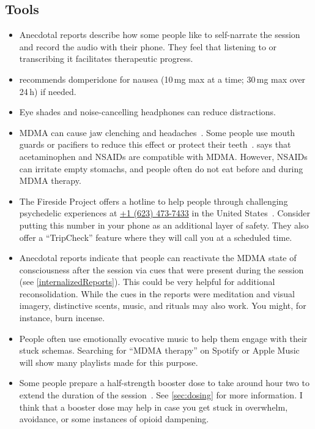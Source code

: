 \documentclass[11pt,oneside]{book}
\let\cite\parencite
\begin{document}
\subsection*{Tools}
\begin{itemize}
    \item Anecdotal reports describe how some people like to self-narrate the session and record the audio with their phone. They feel that listening to or transcribing it facilitates therapeutic progress.
    \item \textcite{liechtiInteractions} recommends domperidone for nausea (10\,mg max at a time; 30\,mg max over 24\,h) if needed.
    \item Eye shades and noise-cancelling headphones can reduce distractions.
    \item MDMA can cause jaw clenching and headaches~\cite{mitchellMDMAClinicalTrial2,liechtiGender}. Some people use mouth guards or pacifiers to reduce this effect or protect their teeth~\cite{emdeEmergency}. \textcite{liechtiInteractions} says that acetaminophen and NSAIDs are compatible with MDMA. However, NSAIDs can irritate empty stomachs, and people often do not eat before and during MDMA therapy.
    \item The Fireside Project offers a hotline to help people through challenging psychedelic experiences at \href{tel:1-623-473-7433}{+1 (623) 473-7433} in the United States~\cite{firesideProject}. Consider putting this number in your phone as an additional layer of safety. They also offer a \enquote{TripCheck} feature where they will call you at a scheduled time.
    \item Anecdotal reports indicate that people can reactivate the MDMA state of consciousness after the session via cues that were present during the session (see \cref{internalizedReports}). This could be very helpful for additional reconsolidation. While the cues in the reports were meditation and visual imagery, distinctive scents, music, and rituals may also work. You might, for instance, burn incense.
    \item People often use emotionally evocative music to help them engage with their stuck schemas. Searching for \enquote{MDMA therapy} on Spotify or Apple Music will show many playlists made for this purpose.
    \item Some people prepare a half-strength booster dose to take around hour two to extend the duration of the session~\cite{mitchellMDMAClinicalTrial2}. See \cref{sec:dosing} for more information. I think that a booster dose may help in case you get stuck in overwhelm, avoidance, or some instances of opioid dampening.
\end{itemize}
\end{document}
